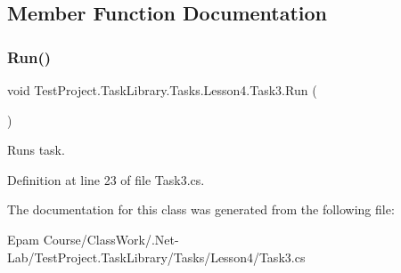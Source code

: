 \subsection{Member Function Documentation}
\mbox{\label{class_test_project_1_1_task_library_1_1_tasks_1_1_lesson4_1_1_task3_a4e1d1771c389611e885a482edf2a310f}} 
\subsubsection{\texorpdfstring{Run()}{Run()}}
{\footnotesize\ttfamily void Test\+Project.\+Task\+Library.\+Tasks.\+Lesson4.\+Task3.\+Run (\begin{DoxyParamCaption}{ }\end{DoxyParamCaption})}



Runs task. 



Definition at line 23 of file Task3.\+cs.



The documentation for this class was generated from the following file\+:\begin{DoxyCompactItemize}
\item 
Epam Course/\+Class\+Work/.\+Net-\/\+Lab/\+Test\+Project.\+Task\+Library/\+Tasks/\+Lesson4/Task3.\+cs\end{DoxyCompactItemize}

